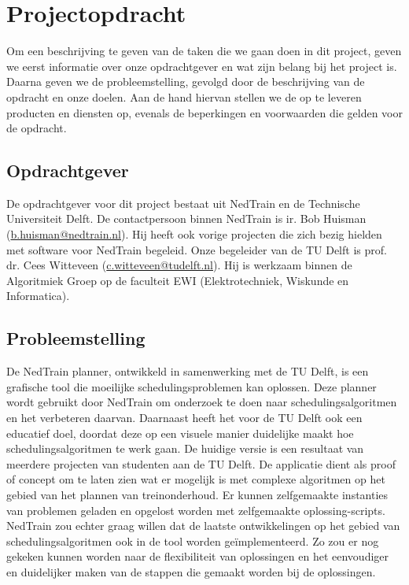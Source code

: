 \section{Projectopdracht}
Om een beschrijving te geven van de taken die we gaan doen in dit project, geven we eerst informatie over onze opdrachtgever en wat zijn belang bij het project is. Daarna geven we de probleemstelling, gevolgd door de beschrijving van de opdracht en onze doelen. Aan de hand hiervan stellen we de op te leveren producten en diensten op, evenals de beperkingen en voorwaarden die gelden voor de opdracht.

\subsection{Opdrachtgever}
De opdrachtgever voor dit project bestaat uit NedTrain en de Technische Universiteit Delft. De contactpersoon binnen NedTrain is ir. Bob Huisman (\href{mailto:b.huisman@nedtrain.nl}{b.huisman@nedtrain.nl}). Hij heeft ook vorige projecten die zich bezig hielden met software voor NedTrain begeleid. Onze begeleider van de TU Delft is prof. dr. Cees Witteveen (\href{mailto:c.witteveen@tudelft.nl}{c.witteveen@tudelft.nl}). Hij is werkzaam binnen de Algoritmiek Groep op de faculteit EWI (Elektrotechniek, Wiskunde en Informatica).

\subsection{Probleemstelling}
De NedTrain planner, ontwikkeld in samenwerking met de TU Delft, is een grafische tool die moeilijke schedulingsproblemen kan oplossen. Deze planner wordt gebruikt door NedTrain om onderzoek te doen naar schedulingsalgoritmen en het verbeteren daarvan. Daarnaast heeft het voor de TU Delft ook een educatief doel, doordat deze op een visuele manier duidelijke maakt hoe schedulingsalgoritmen te werk gaan. De huidige versie is een resultaat van meerdere projecten van studenten aan de TU Delft. De applicatie dient als proof of concept om te laten zien wat er mogelijk is met complexe algoritmen op het gebied van het plannen van treinonderhoud. Er kunnen zelfgemaakte instanties van problemen geladen en opgelost worden met zelfgemaakte oplossing-scripts. NedTrain zou echter graag willen dat de laatste ontwikkelingen op het gebied van schedulingsalgoritmen ook in de tool worden ge\"implementeerd. Zo zou er nog gekeken kunnen worden naar de flexibiliteit van oplossingen en het eenvoudiger en duidelijker maken van de stappen die gemaakt worden bij de oplossingen. 

